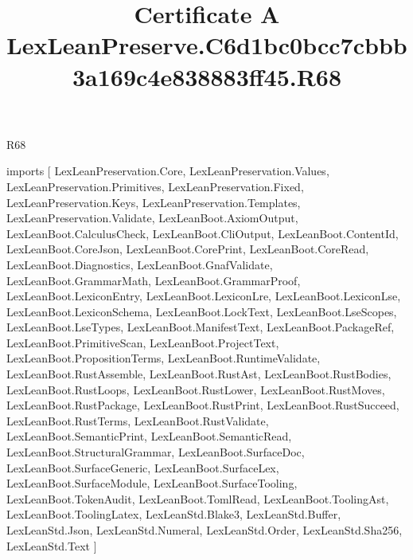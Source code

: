 \begin{lexlean}{R68}
\title{Certificate A LexLeanPreserve.C6d1bc0bcc7cbbb3a169c4e838883ff45.R68}
\begin{coremodule}
imports [
  LexLeanPreservation.Core,
  LexLeanPreservation.Values,
  LexLeanPreservation.Primitives,
  LexLeanPreservation.Fixed,
  LexLeanPreservation.Keys,
  LexLeanPreservation.Templates,
  LexLeanPreservation.Validate,
  LexLeanBoot.AxiomOutput,
  LexLeanBoot.CalculusCheck,
  LexLeanBoot.CliOutput,
  LexLeanBoot.ContentId,
  LexLeanBoot.CoreJson,
  LexLeanBoot.CorePrint,
  LexLeanBoot.CoreRead,
  LexLeanBoot.Diagnostics,
  LexLeanBoot.GnafValidate,
  LexLeanBoot.GrammarMath,
  LexLeanBoot.GrammarProof,
  LexLeanBoot.LexiconEntry,
  LexLeanBoot.LexiconLre,
  LexLeanBoot.LexiconLse,
  LexLeanBoot.LexiconSchema,
  LexLeanBoot.LockText,
  LexLeanBoot.LseScopes,
  LexLeanBoot.LseTypes,
  LexLeanBoot.ManifestText,
  LexLeanBoot.PackageRef,
  LexLeanBoot.PrimitiveScan,
  LexLeanBoot.ProjectText,
  LexLeanBoot.PropositionTerms,
  LexLeanBoot.RuntimeValidate,
  LexLeanBoot.RustAssemble,
  LexLeanBoot.RustAst,
  LexLeanBoot.RustBodies,
  LexLeanBoot.RustLoops,
  LexLeanBoot.RustLower,
  LexLeanBoot.RustMoves,
  LexLeanBoot.RustPackage,
  LexLeanBoot.RustPrint,
  LexLeanBoot.RustSucceed,
  LexLeanBoot.RustTerms,
  LexLeanBoot.RustValidate,
  LexLeanBoot.SemanticPrint,
  LexLeanBoot.SemanticRead,
  LexLeanBoot.StructuralGrammar,
  LexLeanBoot.SurfaceDoc,
  LexLeanBoot.SurfaceGeneric,
  LexLeanBoot.SurfaceLex,
  LexLeanBoot.SurfaceModule,
  LexLeanBoot.SurfaceTooling,
  LexLeanBoot.TokenAudit,
  LexLeanBoot.TomlRead,
  LexLeanBoot.ToolingAst,
  LexLeanBoot.ToolingLatex,
  LexLeanStd.Blake3,
  LexLeanStd.Buffer,
  LexLeanStd.Json,
  LexLeanStd.Numeral,
  LexLeanStd.Order,
  LexLeanStd.Sha256,
  LexLeanStd.Text
]


\end{coremodule}
\end{lexlean}
